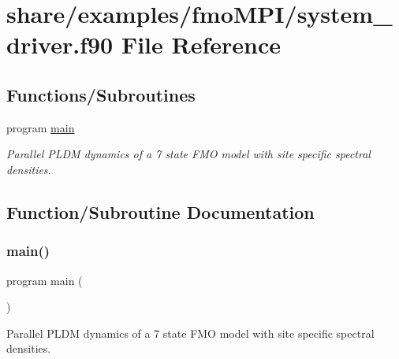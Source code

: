 \hypertarget{share_2examples_2fmo_m_p_i_2system__driver_8f90}{}\section{share/examples/fmo\+M\+P\+I/system\+\_\+driver.f90 File Reference}
\label{share_2examples_2fmo_m_p_i_2system__driver_8f90}
\subsection*{Functions/\+Subroutines}
\begin{DoxyCompactItemize}
\item 
program \hyperlink{share_2examples_2fmo_m_p_i_2system__driver_8f90_a8ec2266d83cd6c0b762cbcbc92c0af3d}{main}
\begin{DoxyCompactList}\small\item\em Parallel P\+L\+DM dynamics of a 7 state F\+MO model with site specific spectral densities. \end{DoxyCompactList}\end{DoxyCompactItemize}


\subsection{Function/\+Subroutine Documentation}
\mbox{\label{share_2examples_2fmo_m_p_i_2system__driver_8f90_a8ec2266d83cd6c0b762cbcbc92c0af3d}} 
\subsubsection{\texorpdfstring{main()}{main()}}
{\footnotesize\ttfamily program main (\begin{DoxyParamCaption}{ }\end{DoxyParamCaption})}



Parallel P\+L\+DM dynamics of a 7 state F\+MO model with site specific spectral densities. 

